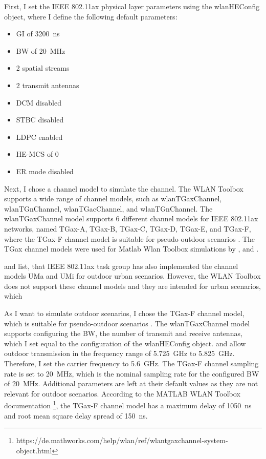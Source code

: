 First, I set the IEEE 802.11ax physical layer parameters using the wlanHEConfig object, where I define the following default parameters:
\begin{itemize}
	\item \ac{GI} of \SI{3200}{\nano\second}
	\item \ac{BW} of \SI{20}{\mega\hertz}
	\item 2 spatial streams
	\item 2 transmit antennas
	\item \ac{DCM} disabled
	\item \ac{STBC} disabled
	\item \ac{LDPC} enabled
	\item HE-\ac{MCS} of 0
	\item \ac{ER} mode disabled
\end{itemize}
Next, I chose a channel model to simulate the channel. The WLAN Toolbox supports a wide range of channel models, such as wlanTGaxChannel, wlanTGnChannel, wlanTGacChannel, and wlanTGnChannel.
The wlanTGaxChannel model supports \num{6} different channel models for IEEE 802.11ax networks, named TGax-A, TGax-B, TGax-C, TGax-D, TGax-E, and TGax-F,
where the TGax-F channel model is suitable for pseudo-outdoor scenarios \cite{TGAXCHANNEL}.
The TGax channel models were used for Matlab Wlan Toolbox simulations by \cite{s_performance_2022}, \cite{cao_efficient_2022} and \cite{jin_efficient_2021}.

\cite{TGAXCHANNEL} and \cite{omar_survey_2016} list, that IEEE 802.11ax task group has also implemented the channel models UMa and UMi for
outdoor urban scenarios. However, the WLAN Toolbox does not support these channel models and they are intended for urban scenarios, which

As I want to simulate outdoor scenarios, I chose the TGax-F channel model, which is suitable for pseudo-outdoor scenarios \cite{TGAXCHANNEL}.
The wlanTGaxChannel model supports configuring the \ac{BW}, the number of transmit and receive antennas, which I set equal to the configuration of the wlanHEConfig object.
\cite{freq_plan_24G} and \cite{freq_plan_5G} allow outdoor transmission in the frequency range of \SI{5.725}{\giga\hertz} to \SI{5.825}{\giga\hertz}. Therefore, I set the carrier frequency to \SI{5.6}{\giga\hertz}.
The TGax-F channel sampling rate is set to \SI{20}{\mega\hertz}, which is the nominal sampling rate for the configured \ac{BW} of \SI{20}{\mega\hertz}.
Additional parameters are left at their default values as they are not relevant for outdoor scenarios. According to the MATLAB WLAN Toolbox documentation \footnote{https://de.mathworks.com/help/wlan/ref/wlantgaxchannel-system-object.html},
the TGax-F channel model has a maximum delay of \SI{1050}{\nano\second} and root mean square delay spread of \SI{150}{\nano\second}.

